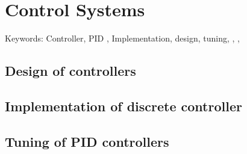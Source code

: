 \chapter{Control Systems}

Keywords:  Controller, PID , Implementation, design, tuning, \citep{nise2011}, \citep{friesel_note7}, \citep{friesel_note9}

\section{Design of controllers}
\section{Implementation of discrete controller}
\section{Tuning of PID controllers}
